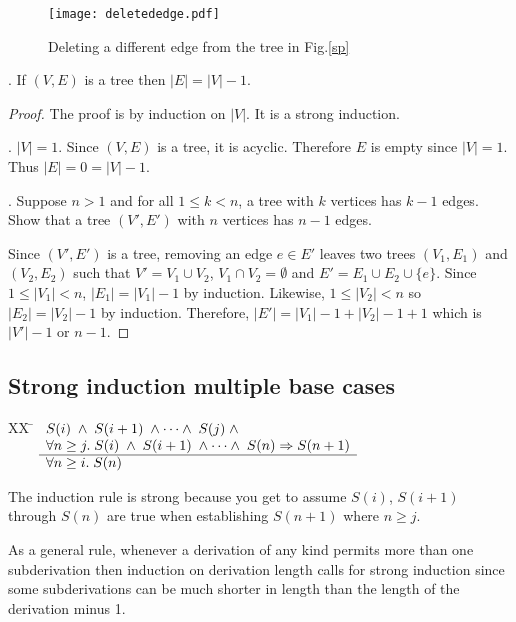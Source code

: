 \documentclass[12pt]{article}
\begin{document}
\begin{figure}[h]
\centering
\texttt{[image: deletededge.pdf]}
\caption{Deleting a different edge from the tree in Fig.\ref{sp}}
\label{2sp}
\end{figure}

. If $(V,E)$ is a tree then $|E| = |V| - 1$.

\begin{proof}
The proof is by induction on $|V|$.
It is a strong induction.

. $|V|=1$.  Since $(V,E)$ is a tree, it is acyclic.
Therefore $E$ is empty since $|V|=1$.  Thus $|E|=0=|V|-1$.

.
Suppose $n>1$ and for all $1\leq k < n$, a tree with $k$ vertices has $k-1$ edges.
Show that a tree $(V',E')$ with $n$ vertices has $n-1$ edges.

Since $(V',E')$ is a tree, removing an edge $e\in E'$ leaves two trees
$(V_1,E_1)$ and $(V_2,E_2)$ such that $V'=V_1\cup V_2$, $V_1\cap V_2=\emptyset$ and
$E' = E_1\cup E_2\cup\{e\}$.
Since $1\leq |V_1| < n$, $|E_1|= |V_1|-1$ by induction.
Likewise, $1\leq |V_2| < n$ so $|E_2| = |V_2|-1$ by induction.
Therefore, $|E'| = |V_1| - 1 + |V_2| - 1 + 1$ which is $|V'|-1$ or $n-1$.
\end{proof}

\subsection{Strong induction multiple base cases}
\begin{tabbing}
[3]XX \=  \kill
[3] \>
	\(\begin{array}[t]{l}
	S(i) \;\wedge\; S(i+1)\;\wedge\cdots\wedge\;S(j)\;\wedge\; \\
\forall n \geq j.\;S(i)\;\wedge\;S(i+1)\;\wedge\cdots\wedge\;S(n) \Rightarrow S(n+1) \\
	\hline
	\forall n \geq i. \; S(n)
	\end{array}\) %
\end{tabbing}
The induction rule is strong because you get to assume
$S(i)$, $S(i+1)$ through $S(n)$ are true when establishing $S(n+1)$ where $n\geq j$.

As a general rule, whenever a derivation of any kind permits more than one subderivation then
induction on derivation length calls for strong induction since some subderivations can be
much shorter in length than the length of the derivation minus 1.  
\end{document}
